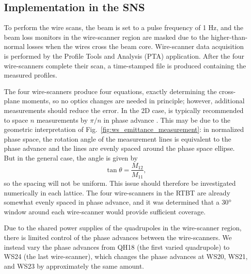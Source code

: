 \subsection{Implementation in the SNS}

To perform the wire scans, the beam is set to a pulse frequency of 1 Hz, and the beam loss monitors in the wire-scanner region are masked due to the higher-than-normal losses when the wires cross the beam core. Wire-scanner data acquisition is performed by the Profile Tools and Analysis (PTA) application. After the four wire-scanners complete their scan, a time-stamped file is produced containing the measured profiles.

The four wire-scanners produce four equations, exactly determining the cross-plane moments, so no optics changes are needed in principle; however, additional measurements should reduce the error. In the 2D case, is typically recommended to space $n$ measurements by $\pi / n$ in phase advance \cite{book:Minty2003}. This may be due to the geometric interpretation of Fig.~\ref{fig:ws_emittance_measurement}: in normalized phase space, the rotation angle of the measurement lines is equivalent to the phase advance and the lines are evenly spaced around the phase space ellipse. But in the general case, the angle is given by \cite{Hock2011}
%
\begin{equation}
    \tan\theta = \frac{M_{12}}{M_{11}},
\end{equation}
%
so the spacing will not be uniform. This issue should therefore be investigated numerically in each lattice. The four wire-scanners in the RTBT are already somewhat evenly spaced in phase advance, and it was determined that a 30$\degree$ window around each wire-scanner would provide sufficient coverage. 

Due to the shared power supplies of the quadrupoles in the wire-scanner region, there is limited control of the phase advances between the wire-scanners. We instead vary the phase advances from QH18 (the first varied quadrupole) to WS24 (the last wire-scanner), which changes the phase advances at WS20, WS21, and WS23 by approximately the same amount. 

